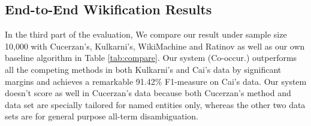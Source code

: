 %

\subsection{End-to-End Wikification Results}
In the third part of the evaluation,
We compare our result under sample size 10,000 with Cucerzan's, Kulkarni's, WikiMachine and
Ratinov as well as our own baseline algorithm in Table \ref{tab:compare}.
Our system (Co-occur.) outperforms all the competing methods in both
Kulkarni's and Cai's data by significant margins and achieves a remarkable
91.42\% F1-measure on Cai's data.
Our system doesn't score as well in
Cucerzan's data because both Cucerzan's method and data set are
specially tailored for named entities only, whereas the other two data sets
are for general purpose all-term disambiguation.

